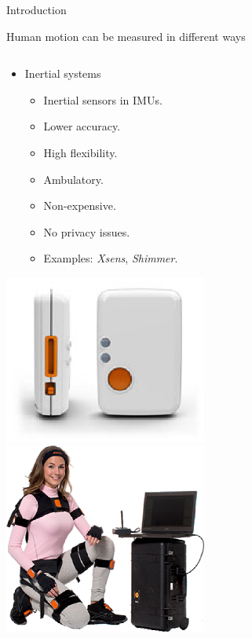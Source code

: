 \documentclass[10pt,aspectratio=1610]{beamer}
\begin{document}
\begin{frame}{Introduction}{}
\begin{block}{Human motion can be measured in different ways}
\begin{columns}
    \begin{column}{.5\linewidth}
    	\begin{itemize}
	    	\item Inertial systems
	    	\begin{itemize}
	    		\item Inertial sensors in IMUs.
	    		\item Lower accuracy.
	    		\item High flexibility.
	    		\item Ambulatory.
	    		\item Non-expensive.
	    		\item No privacy issues.
	    		\item Examples: \textit{Xsens}, \textit{Shimmer}.
	    	\end{itemize}
    	\end{itemize}
    	 \includegraphics[width=0.5\textwidth]{AAUgraphics/Shimmer.eps}
    	 \includegraphics[width=0.5\textwidth]{AAUgraphics/xsens.eps}    
    \end{column}
\end{columns}
\end{block}
\end{frame}
\end{document}

